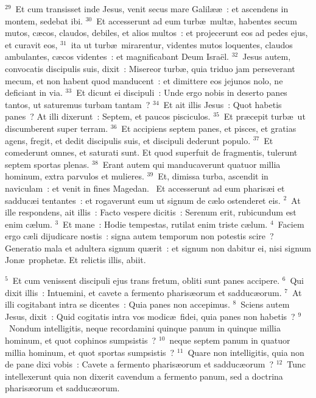 ${}^{29}$~Et cum transisset inde Jesus, venit secus mare Galil\ae \ae~: et ascendens in montem, sedebat ibi.
${}^{30}$~Et accesserunt ad eum turb\ae\ mult\ae , habentes secum mutos, c\ae cos, claudos, debiles, et alios multos~: et projecerunt eos ad pedes ejus, et curavit eos,
${}^{31}$~ita ut turb\ae\ mirarentur, videntes mutos loquentes, claudos ambulantes, c\ae cos videntes~: et magnificabant Deum Isra\"el.
${}^{32}$~Jesus autem, convocatis discipulis suis, dixit~: Misereor turb\ae , quia triduo jam perseverant mecum, et non habent quod manducent~: et dimittere eos jejunos nolo, ne deficiant in via.
${}^{33}$~Et dicunt ei discipuli~: Unde ergo nobis in deserto panes tantos, ut saturemus turbam tantam~?
${}^{34}$~Et ait illis Jesus~: Quot habetis panes~? At illi dixerunt~: Septem, et paucos pisciculos.
${}^{35}$~Et pr\ae cepit turb\ae\ ut discumberent super terram.
${}^{36}$~Et accipiens septem panes, et pisces, et gratias agens, fregit, et dedit discipulis suis, et discipuli dederunt populo.
${}^{37}$~Et comederunt omnes, et saturati sunt. Et quod superfuit de fragmentis, tulerunt septem sportas plenas.
${}^{38}$~Erant autem qui manducaverunt quatuor millia hominum, extra parvulos et mulieres.
${}^{39}$~Et, dimissa turba, ascendit in naviculam~: et venit in fines Magedan.
~Et accesserunt ad eum pharis\ae i et sadduc\ae i tentantes~: et rogaverunt eum ut signum de c\ae lo ostenderet eis.
${}^{2}$~At ille respondens, ait illis~: Facto vespere dicitis~: Serenum erit, rubicundum est enim c\ae lum.
${}^{3}$~Et mane~: Hodie tempestas, rutilat enim triste c\ae lum.
${}^{4}$~Faciem ergo c\ae li dijudicare nostis~: signa autem temporum non potestis scire~? Generatio mala et adultera signum qu\ae rit~: et signum non dabitur ei, nisi signum Jon\ae\ prophet\ae . Et relictis illis, abiit.


${}^{5}$~Et cum venissent discipuli ejus trans fretum, obliti sunt panes accipere.
${}^{6}$~Qui dixit illis~: Intuemini, et cavete a fermento pharis\ae orum et sadduc\ae orum.
${}^{7}$~At illi cogitabant intra se dicentes~: Quia panes non accepimus.
${}^{8}$~Sciens autem Jesus, dixit~: Quid cogitatis intra vos modic\ae\ fidei, quia panes non habetis~?
${}^{9}$~Nondum intelligitis, neque recordamini quinque panum in quinque millia hominum, et quot cophinos sumpsistis~?
${}^{10}$~neque septem panum in quatuor millia hominum, et quot sportas sumpsistis~?
${}^{11}$~Quare non intelligitis, quia non de pane dixi vobis~: Cavete a fermento pharis\ae orum et sadduc\ae orum~?
${}^{12}$~Tunc intellexerunt quia non dixerit cavendum a fermento panum, sed a doctrina pharis\ae orum et sadduc\ae orum.


